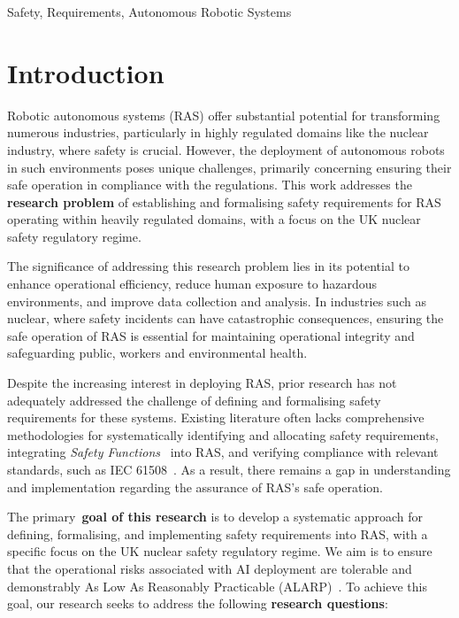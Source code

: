\documentclass[conference]{IEEEtran}
\newcommand{\louisenote}[1]{\todo[color=green!65]{Louise: #1}}
\begin{document}
\begin{IEEEkeywords}
Safety, Requirements, Autonomous Robotic Systems
\end{IEEEkeywords}


\section{Introduction}
Robotic autonomous systems (RAS) offer substantial potential for transforming numerous industries, particularly in highly regulated domains like the nuclear industry, where safety is crucial. However, the deployment of autonomous robots in such environments poses unique challenges, primarily concerning ensuring their safe operation in compliance with the regulations. This work addresses the \textbf{research problem} of establishing and formalising safety requirements for RAS operating within heavily regulated domains, with a focus on the UK nuclear safety regulatory regime.

The significance of addressing this research problem lies in its potential to enhance operational efficiency, reduce human exposure to hazardous environments, and improve data collection and analysis. In industries such as nuclear, where safety incidents can have catastrophic consequences, ensuring the safe operation of RAS is essential for maintaining operational integrity and safeguarding public, workers and environmental health.

Despite the increasing interest in deploying RAS, prior research has not adequately addressed the challenge of defining and formalising safety requirements for these systems. Existing literature often lacks comprehensive methodologies for systematically identifying and allocating safety requirements, integrating \textit{Safety Functions}~\cite{SIFinHighDemandMode} into RAS, and verifying compliance with relevant standards, such as IEC 61508~\cite{FunctionalSafety}. As a result, there remains a gap in understanding and implementation regarding the assurance of RAS's safe operation.

The primary~\textbf{goal of this research} is to develop a systematic approach for defining, formalising, and implementing safety requirements into RAS, %
with a specific focus on the UK nuclear safety regulatory regime. We aim is to ensure that the operational risks associated with AI deployment are tolerable and demonstrably As Low As Reasonably Practicable (ALARP)~\cite{NS-TAST-GD-005}. %
To achieve this goal, our research seeks to address the following \textbf{research questions}:
\end{document}
